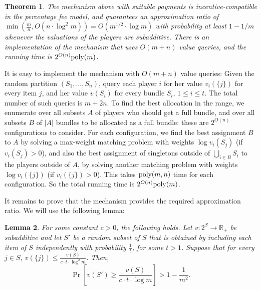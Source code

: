 \documentclass{article}
\newtheorem{theorem}{Theorem}\newtheorem{lemma}[theorem]{Lemma}\newtheorem{proposition}[theorem]{Proposition}\newtheorem{corollary}[theorem]{Corollary}\newtheorem{definition}[theorem]{Definition}\newtheorem{claim}[theorem]{Claim}\newtheorem*{claim*}{Claim}\newenvironment{subproof}{\begin{proof}[Proof of claim]}{\end{proof}}
\newcommand{\R}{\mathbb{R}}
\newcommand{\poly}{\hbox{poly}}
\begin{document}
\begin{theorem}
The mechanism above with suitable payments is incentive-compatible in the percentage fee model, and guarantees an approximation ratio of $\min(\frac m n, O(n\cdot \log^2m)) = O({m}^{1/2} \cdot \log m)$ with probability at least $1-1/m$ whenever the valuations of the players are subadditive. There is an implementation of the mechanism that uses $O(m+n)$ value queries, and the running time is $2^{O(n)} \poly(m)$.
\end{theorem}


It is easy to implement the mechanism with $O(m+n)$ value queries: Given the random partition $(S_1,\ldots,S_n)$, query each player $i$ for her value $v_i(\{j\})$ for every item $j$, and her value $v(S_i)$ for every bundle $S_i$, $1\leq i\leq t$. The total number of such queries is $m+2n$. To find the best allocation in the range, we enumerate over all subsets $A$ of players who should get a full bundle, and over all subsets $B$ of $|A|$ bundles to be allocated as a full bundle: these are $2^{O(n)}$ configurations to consider. For each configuration, we find the best assignment $B$ to $A$ by solving a max-weight matching problem with weights $\log v_i(S_j)$ (if $v_i(S_j)>0$), and also the best assignment of singletons outside of $\bigcup_{i \in B} S_i$ to the players outside of $A$, by solving another matching problem with weights $\log v_i(\{j\})$ (if $v_i(\{j\})>0$). This takes $\poly(m,n)$ time for each configuration. So the total running time is $2^{O(n)} \poly(m)$. 




It remains to prove that the mechanism provides the required approximation ratio. We will use the following lemma:

\begin{lemma}\label{lemma:subadditive-lower-tail}
For some constant $c>0$, the following holds. Let $v:2^S \to \R_+$ be subadditive and let $S'$ be a random subset of $S$ that is obtained by including each item of $S$ independently with probability $\frac 1 t$, for some $t>1$. Suppose that for every  $j \in S$, $v(\{j\}) \leq \frac {v(S)} {c\cdot t\cdot \log^2 m}$. Then, 
$$\Pr\left[v(S') \geq \frac {v(S)} {c\cdot t\cdot \log m} \right] > 1 - \frac{1}{m^2}.$$
\end{lemma}
\end{document}
